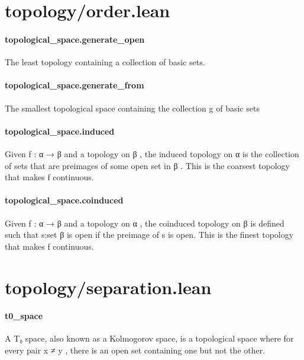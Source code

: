 \documentclass{article}
\begin{document}
\section{topology/order.lean}\paragraph{topological\_space.generate\_open}
\par
The least topology containing a collection of basic sets.
\paragraph{topological\_space.generate\_from}
\par
The smallest topological space containing the collection 
\colorbox[RGB]{253,246,227}{{{{\color[RGB]{101, 123, 131} g }}}} of basic sets
\paragraph{topological\_space.induced}
\par
Given 
\colorbox[RGB]{253,246,227}{{{{\color[RGB]{101, 123, 131} f : α  }}}{{{\color[RGB]{133, 153, 0} → }}}{{{\color[RGB]{101, 123, 131}  β }}}} and a topology on 
\colorbox[RGB]{253,246,227}{{{{\color[RGB]{101, 123, 131} β }}}}, the induced topology on 
\colorbox[RGB]{253,246,227}{{{{\color[RGB]{101, 123, 131} α }}}} is the collection of
sets that are preimages of some open set in 
\colorbox[RGB]{253,246,227}{{{{\color[RGB]{101, 123, 131} β }}}}. This is the coarsest topology that
makes 
\colorbox[RGB]{253,246,227}{{{{\color[RGB]{101, 123, 131} f }}}} continuous.
\paragraph{topological\_space.coinduced}
\par
Given 
\colorbox[RGB]{253,246,227}{{{{\color[RGB]{101, 123, 131} f : α  }}}{{{\color[RGB]{133, 153, 0} → }}}{{{\color[RGB]{101, 123, 131}  β }}}} and a topology on 
\colorbox[RGB]{253,246,227}{{{{\color[RGB]{101, 123, 131} α }}}}, the coinduced topology on 
\colorbox[RGB]{253,246,227}{{{{\color[RGB]{101, 123, 131} β }}}} is defined
such that 
\colorbox[RGB]{253,246,227}{{{{\color[RGB]{101, 123, 131} s:set β }}}} is open if the preimage of 
\colorbox[RGB]{253,246,227}{{{{\color[RGB]{101, 123, 131} s }}}} is open. This is the finest topology that
makes 
\colorbox[RGB]{253,246,227}{{{{\color[RGB]{101, 123, 131} f }}}} continuous.
\section{topology/separation.lean}\paragraph{t0\_space}
\par
A T₀ space, also known as a Kolmogorov space, is a topological space
where for every pair 
\colorbox[RGB]{253,246,227}{{{{\color[RGB]{101, 123, 131} x  }}}{{{\color[RGB]{181, 137, 0} ≠ }}}{{{\color[RGB]{101, 123, 131}  y }}}}, there is an open set containing one but not the other.
\end{document}
